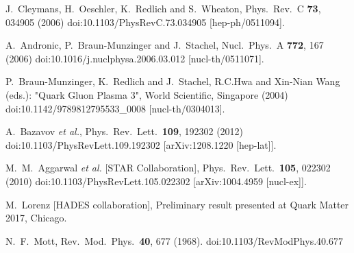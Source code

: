 \documentclass[12pt]{article}
\begin{document}
\begin{thebibliography}{99}
  J.~Cleymans, H.~Oeschler, K.~Redlich and S.~Wheaton,
  Phys.\ Rev.\ C {\bf 73}, 034905 (2006)
  doi:10.1103/PhysRevC.73.034905
  [hep-ph/0511094].

  A.~Andronic, P.~Braun-Munzinger and J.~Stachel,
  Nucl.\ Phys.\ A {\bf 772}, 167 (2006)
  doi:10.1016/j.nuclphysa.2006.03.012
  [nucl-th/0511071].
	
  P.~Braun-Munzinger, K.~Redlich and J.~Stachel,
  R.C.Hwa and Xin-Nian Wang (eds.): "Quark Gluon Plasma 3", World Scientific, Singapore (2004) 
	doi:10.1142/9789812795533\_0008
  [nucl-th/0304013].

  A.~Bazavov {\it et al.},
  Phys.\ Rev.\ Lett.\  {\bf 109}, 192302 (2012)
  doi:10.1103/PhysRevLett.109.192302
  [arXiv:1208.1220 [hep-lat]].
	
  M.~M.~Aggarwal {\it et al.} [STAR Collaboration],
  Phys.\ Rev.\ Lett.\  {\bf 105}, 022302 (2010)
  doi:10.1103/PhysRevLett.105.022302
  [arXiv:1004.4959 [nucl-ex]].

 M.~Lorenz [HADES collaboration],
 Preliminary result presented at Quark Matter 2017, Chicago.

  N.~F.~Mott,
  Rev.\ Mod.\ Phys.\  {\bf 40}, 677 (1968).
  doi:10.1103/RevModPhys.40.677


\end{thebibliography}
\end{document}
